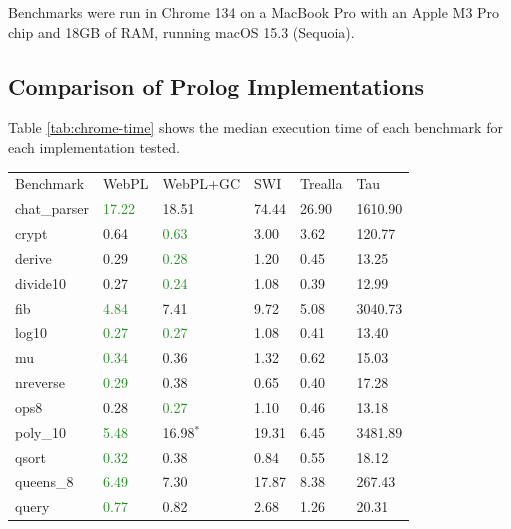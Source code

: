 Benchmarks were run in Chrome 134 on a MacBook Pro with an Apple M3 Pro chip and 18GB of RAM, running macOS 15.3 (Sequoia).

\subsection{Comparison of Prolog Implementations}

\label{sec:prolog-comparison}

Table \ref{tab:chrome-time} shows the median execution time of each benchmark for each implementation tested.

\begin{table}[H]
\centering
{}
\begin{tabular}{llllll}
\addlinespace\hline\addlinespace
Benchmark & WebPL & WebPL+GC & SWI & Trealla & Tau \\
\addlinespace\hline\addlinespace
chat\_parser  & \textcolor{ForestGreen}{17.22}  &  18.51  &  74.44  &  26.90  &  1610.90  \\
crypt        &   0.64  &   \textcolor{ForestGreen}{0.63}  &   3.00  &   3.62  &   120.77  \\
derive       &   0.29  &   \textcolor{ForestGreen}{0.28}  &   1.20  &   0.45  &    13.25  \\
divide10     &   0.27  &   \textcolor{ForestGreen}{0.24}  &   1.08  &   0.39  &    12.99  \\
fib          &   \textcolor{ForestGreen}{4.84}  &   7.41  &   9.72  &   5.08  &  3040.73  \\
log10        &   \textcolor{ForestGreen}{0.27}  &   \textcolor{ForestGreen}{0.27}  &   1.08  &   0.41  &    13.40  \\
mu           &   \textcolor{ForestGreen}{0.34}  &   0.36  &   1.32  &   0.62  &    15.03  \\
nreverse     &   \textcolor{ForestGreen}{0.29}  &   0.38  &   0.65  &   0.40  &    17.28  \\
ops8         &   0.28  &   \textcolor{ForestGreen}{0.27}  &   1.10  &   0.46  &    13.18  \\
poly\_10      &   \textcolor{ForestGreen}{5.48}  &  16.98$^*$  &  19.31  &   6.45  &  3481.89  \\
qsort        &   \textcolor{ForestGreen}{0.32}  &   0.38  &   0.84  &   0.55  &    18.12  \\
queens\_8     &   \textcolor{ForestGreen}{6.49}  &   7.30  &  17.87  &   8.38  &   267.43  \\
query        &  \textcolor{ForestGreen}{0.77}  &   0.82  &   2.68  &   1.26  &    20.31  \\

\end{tabular}
\end{table}
